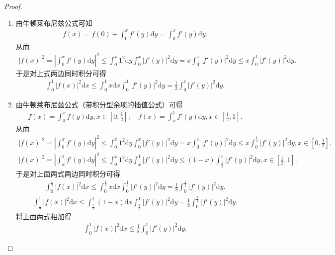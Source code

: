 \documentclass[../../main.tex]{subfiles}
\begin{document}
\begin{proof}
\begin{enumerate}
\item 由牛顿莱布尼兹公式可知
\begin{align*}
f(x) = f(0) + \int_{0}^{x}f'(y)\mathrm{d}y=\int_{0}^{x}f'(y)\mathrm{d}y.
\end{align*}
从而
\begin{align*}
|f(x)|^2 = \left| \int_{0}^{x}f'(y)\mathrm{d}y \right|^2 \leqslant \int_{0}^{x}1^2\mathrm{d}y \int_{0}^{x}|f'(y)|^2\mathrm{d}y = x\int_{0}^{x}|f'(y)|^2\mathrm{d}y \leqslant x\int_{0}^{1}|f'(y)|^2\mathrm{d}y.
\end{align*}
于是对上式两边同时积分可得
\begin{align*}
\int_{0}^{1}|f(x)|^2\mathrm{d}x \leqslant \int_{0}^{1}x\mathrm{d}x \int_{0}^{1}|f'(y)|^2\mathrm{d}y = \frac{1}{2}\int_{0}^{1}|f'(y)|^2\mathrm{d}y.
\end{align*}

\item 由牛顿莱布尼兹公式（带积分型余项的插值公式）可得
\begin{align*}
f(x) = \int_{0}^{x}f(y)\mathrm{d}y, x \in \left[0, \frac{1}{2}\right]; \quad f(x) = \int_{x}^{1}f'(y)\mathrm{d}y, x \in \left[\frac{1}{2}, 1\right].
\end{align*}
从而
\begin{align*}
|f(x)|^2 = \left| \int_{0}^{x}f'(y)\mathrm{d}y \right|^2 \leqslant \int_{0}^{x}1^2\mathrm{d}y\int_{0}^{x}|f'(y)|^2\mathrm{d}y = x\int_{0}^{x}|f'(y)|^2\mathrm{d}y \leqslant x\int_{0}^{\frac{1}{2}}|f'(y)|^2\mathrm{d}y, x \in \left[0, \frac{1}{2}\right].
\end{align*}
\begin{align*}
|f(x)|^2 = \left| \int_{x}^{1}f'(y)\mathrm{d}y \right|^2 \leqslant \int_{0}^{x}1^2\mathrm{d}y\int_{x}^{1}|f'(y)|^2\mathrm{d}y \leqslant (1 - x)\int_{\frac{1}{2}}^{1}|f'(y)|^2\mathrm{d}y, x \in \left[\frac{1}{2}, 1\right].
\end{align*}
于是对上面两式两边同时积分可得
\begin{align*}
\int_{0}^{\frac{1}{2}}|f(x)|^2\mathrm{d}x \leqslant \int_{0}^{\frac{1}{2}}x\mathrm{d}x\int_{0}^{\frac{1}{2}}|f'(y)|^2\mathrm{d}y = \frac{1}{8}\int_{0}^{\frac{1}{2}}|f'(y)|^2\mathrm{d}y.
\end{align*}
\begin{align*}
\int_{\frac{1}{2}}^{1}|f(x)|^2\mathrm{d}x \leqslant \int_{\frac{1}{2}}^{1}(1 - x)\mathrm{d}x\int_{\frac{1}{2}}^{1}|f'(y)|^2\mathrm{d}y = \frac{1}{8}\int_{0}^{\frac{1}{2}}|f'(y)|^2\mathrm{d}y.
\end{align*}
将上面两式相加得
\begin{align*}
\int_{0}^{1}|f(x)|^2\mathrm{d}x \leqslant \frac{1}{8}\int_{0}^{1}|f'(y)|^2\mathrm{d}y.
\end{align*}
\end{enumerate}
\end{proof}
\end{document}
